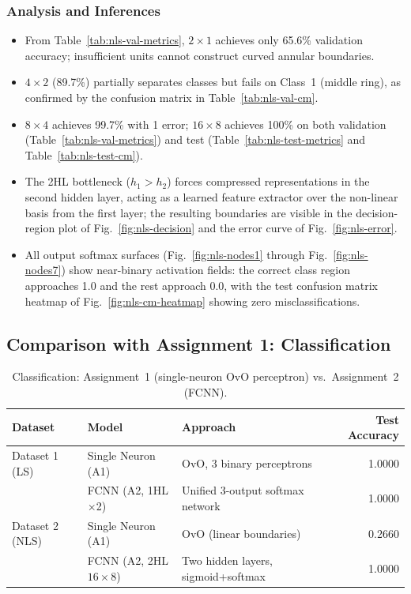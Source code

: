 \documentclass[11pt,a4paper]{article}
\begin{document}
\subsubsection*{Analysis and Inferences}
\begin{itemize}
    \item From Table~\ref{tab:nls-val-metrics}, $2\times1$ achieves only 65.6\% validation accuracy; insufficient units cannot construct curved annular boundaries.
    \item $4\times2$ (89.7\%) partially separates classes but fails on Class~1 (middle ring), as confirmed by the confusion matrix in Table~\ref{tab:nls-val-cm}.
    \item $8\times4$ achieves 99.7\% with 1 error; $16\times8$ achieves 100\% on both validation (Table~\ref{tab:nls-val-metrics}) and test (Table~\ref{tab:nls-test-metrics} and Table~\ref{tab:nls-test-cm}).
    \item The 2HL bottleneck ($h_1>h_2$) forces compressed representations in the second hidden layer, acting as a learned feature extractor over the non-linear basis from the first layer; the resulting boundaries are visible in the decision-region plot of Fig.~\ref{fig:nls-decision} and the error curve of Fig.~\ref{fig:nls-error}.
    \item All output softmax surfaces (Fig.~\ref{fig:nls-nodes1} through Fig.~\ref{fig:nls-nodes7}) show near-binary activation fields: the correct class region approaches 1.0 and the rest approach 0.0, with the test confusion matrix heatmap of Fig.~\ref{fig:nls-cm-heatmap} showing zero misclassifications.
\end{itemize}

\subsection{Comparison with Assignment 1: Classification}

\begin{table}[H]
\centering
\caption{Classification: Assignment~1 (single-neuron OvO perceptron) vs.\ Assignment~2 (FCNN).}
\label{tab:class-a1-a2}
\begin{tabular}{lllr}
\toprule
Dataset & Model & Approach & Test Accuracy \\
\midrule
Dataset 1 (LS)  & Single Neuron (A1) & OvO, 3 binary perceptrons & 1.0000 \\
                & FCNN (A2, 1HL$\times$2) & Unified 3-output softmax network & 1.0000 \\
\midrule
Dataset 2 (NLS) & Single Neuron (A1) & OvO (linear boundaries) & 0.2660 \\
                & FCNN (A2, 2HL $16\times8$) & Two hidden layers, sigmoid+softmax & 1.0000 \\
\bottomrule
\end{tabular}
\end{table}
\end{document}
